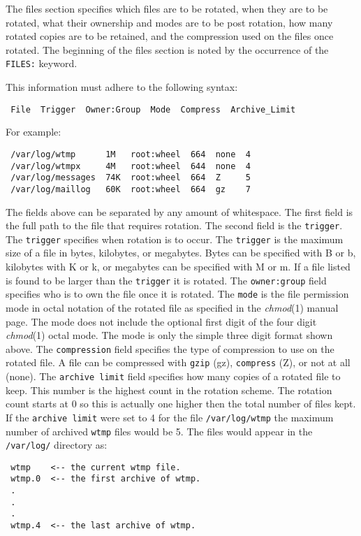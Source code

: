 \documentclass{article}
\begin{document}
The files section specifies which files are to be rotated, when they are
to be rotated, what their ownership and modes are to be post rotation,
how many rotated copies are to be retained, and the compression used on
the files once rotated.  The beginning of the files section is noted by
the occurrence of the {\tt FILES:} keyword.

This information must adhere to the following syntax:
\begin{verbatim}
 File  Trigger  Owner:Group  Mode  Compress  Archive_Limit
\end{verbatim}

For example:
\begin{verbatim}
 /var/log/wtmp      1M   root:wheel  664  none  4
 /var/log/wtmpx     4M   root:wheel  644  none  4
 /var/log/messages  74K  root:wheel  664  Z     5
 /var/log/maillog   60K  root:wheel  664  gz    7
\end{verbatim}

The fields above can be separated by any amount of whitespace.  The
first field is the full path to the file that requires rotation.  The
second field is the {\tt trigger}.  The {\tt trigger} specifies when rotation
is to occur.  The {\tt trigger} is the maximum size of a file in bytes,
kilobytes, or megabytes.  Bytes can be specified with B or b, kilobytes
with K or k, or megabytes can be specified with M or m.  If a file
listed is found to be larger than the {\tt trigger} it is rotated.  The
{\tt owner:group} field specifies who is to own the file once it is
rotated.  The {\tt mode} is the file permission mode in octal notation of
the rotated file as specified in the {\em chmod\/}(1) manual page.  The mode
does not include the optional first digit of the four digit {\em chmod\/}(1)
octal mode.  The mode is only the simple three digit format shown above.
The {\tt compression} field specifies the type of compression to use on the
rotated file.  A file can be compressed with {\tt gzip} (gz), {\tt compress}
(Z), or not at all (none).  The {\tt archive limit} field specifies how
many copies of a rotated file to keep.  This number is the highest count
in the rotation scheme.  The rotation count starts at 0 so this is
actually one higher then the total number of files kept.  If the
{\tt archive limit} were set to 4 for the file {\tt /var/log/wtmp} the maximum
number of archived {\tt wtmp} files would be 5.  The files would appear in
the {\tt /var/log/} directory as:
\begin{verbatim}
 wtmp    <-- the current wtmp file.
 wtmp.0  <-- the first archive of wtmp.
 .
 .
 .
 wtmp.4  <-- the last archive of wtmp.
\end{verbatim}
\end{document}
